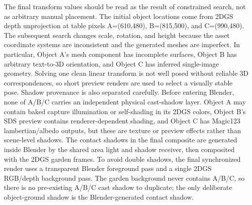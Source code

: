 \documentclass[10pt,twocolumn,letterpaper]{article}
\begin{document}
The final transform values should be read as the result of constrained search, not as arbitrary manual placement.
The initial object locations come from 2DGS depth unprojection at table pixels A=(610,480), B=(815,500), and C=(990,480).
The subsequent search changes scale, rotation, and height because the asset coordinate systems are inconsistent and the generated meshes are imperfect.
In particular, Object A's mesh component has incomplete surfaces, Object B has arbitrary text-to-3D orientation, and Object C has inferred single-image geometry.
Solving one clean linear transform is not well posed without reliable 3D correspondences, so short preview renders are used to select a visually stable pose.
Shadow provenance is also separated carefully.
Before entering Blender, none of A/B/C carries an independent physical cast-shadow layer.
Object A may contain baked capture illumination or self-shading in its 2DGS colors, Object B's SDS preview contains renderer-dependent shading, and Object C has Magic123 lambertian/albedo outputs, but these are texture or preview effects rather than scene-level shadows.
The contact shadows in the final composite are generated inside Blender by the shared area light and shadow receiver, then composited with the 2DGS garden frames.
To avoid double shadows, the final synchronized render uses a transparent Blender foreground pass and a single 2DGS RGB/depth background pass.
The garden background never contains A/B/C, so there is no pre-existing A/B/C cast shadow to duplicate; the only deliberate object-ground shadow is the Blender-generated contact shadow.
\end{document}
